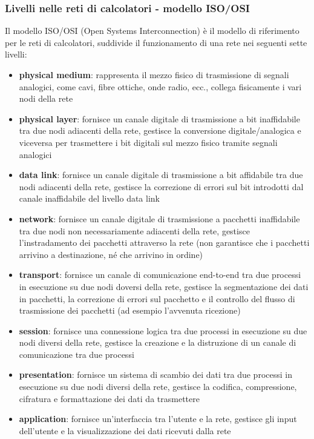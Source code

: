 \subsubsection*{Livelli nelle reti di calcolatori - modello ISO/OSI}
Il modello ISO/OSI (Open Systems Interconnection) è il modello di riferimento per le reti di calcolatori,
suddivide il funzionamento di una rete nei seguenti sette livelli:
\begin{itemize}
	\item[0.] \textbf{physical medium}: rappresenta il mezzo fisico di trasmissione di segnali analogici, come cavi, fibre
	ottiche, onde radio, ecc., collega fisicamente i vari nodi della rete
	\item[L1.] \textbf{physical layer}: fornisce un canale digitale di trasmissione a bit inaffidabile tra due nodi adiacenti della
	rete, gestisce la conversione digitale/analogica e viceversa per trasmettere i bit digitali sul mezzo fisico tramite
	segnali analogici
	\item[L2.] \textbf{data link}: fornisce un canale digitale di trasmissione a bit affidabile tra due nodi adiacenti della rete,
	gestisce la correzione di errori sul bit introdotti dal canale inaffidabile del livello data link
	\item[L3.] \textbf{network}: fornisce un canale digitale di trasmissione a pacchetti inaffidabile tra due nodi non
	necessariamente adiacenti della rete, gestisce l'instradamento dei pacchetti attraverso la rete (non garantisce che i
	pacchetti arrivino a destinazione, né che arrivino in ordine)
	\item[L4.] \textbf{transport}: fornisce un canale di comunicazione end-to-end tra due processi in esecuzione su due nodi
	doversi della rete, gestisce la segmentazione dei dati in pacchetti, la correzione di errori sul pacchetto e il controllo
	del flusso di trasmissione dei pacchetti (ad esempio l'avvenuta ricezione)
	\item[L5.] \textbf{session}: fornisce una connessione logica tra due processi in esecuzione su due nodi diversi della
	rete, gestisce la creazione e la distruzione di un canale di comunicazione tra due processi
	\item[L6.] \textbf{presentation}: fornisce un sistema di scambio dei dati tra due processi in esecuzione su due nodi
	diversi della rete, gestisce la codifica, compressione, cifratura e formattazione dei dati da trasmettere
	\item[L7.] \textbf{application}: fornisce un'interfaccia tra l'utente e la rete, gestisce gli input dell'utente e la
	 visualizzazione dei dati ricevuti dalla rete
\end{itemize}

